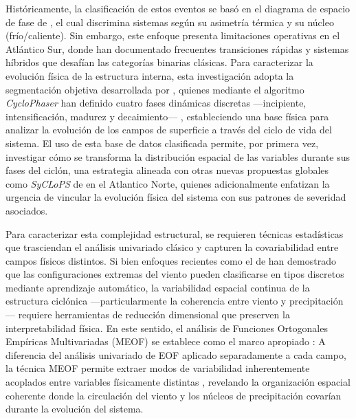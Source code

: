 Históricamente, la clasificación de estos eventos se basó en el diagrama de espacio de fase de \citet{hart2003cyclone}, el cual discrimina sistemas según su asimetría térmica y su núcleo (frío/caliente). Sin embargo, este enfoque presenta limitaciones operativas en el Atlántico Sur, donde \citet{reboita2022from} han documentado frecuentes transiciones rápidas y sistemas híbridos que desafían las categorías binarias clásicas. Para caracterizar la evolución física de la estructura interna, esta investigación adopta la segmentación objetiva desarrollada por \citet{coutodesouza2024new}, quienes mediante el algoritmo \textit{CycloPhaser} han definido cuatro fases dinámicas discretas —incipiente, intensificación, madurez y decaimiento— \citep{deSouza2025CycloPhaser}, estableciendo una base física para analizar la evolución de los campos de superficie a través del ciclo de vida del sistema. El uso de esta base de datos clasificada permite, por primera vez, investigar cómo se transforma la distribución espacial de las variables durante sus fases del ciclón, una estrategia alineada con otras nuevas propuestas globales como \textit{SyCLoPS} de \citet{han2025system} en el Atlantico Norte, quienes adicionalmente enfatizan la urgencia de vincular la evolución física del sistema con sus patrones de severidad asociados.

\label{subsec:intro_estrategia_estadistica}%
Para caracterizar esta complejidad estructural, se requieren técnicas estadísticas que trasciendan el análisis univariado clásico y capturen la covariabilidad entre campos físicos distintos. Si bien enfoques recientes como el de \citet{eisenstein2023identification} han demostrado que las configuraciones extremas del viento pueden clasificarse en tipos discretos mediante aprendizaje automático, la variabilidad espacial continua de la estructura ciclónica ---particularmente la coherencia entre viento y precipitación--- requiere herramientas de reducción dimensional que preserven la interpretabilidad física. En este sentido, el análisis de Funciones Ortogonales Empíricas Multivariadas (MEOF) se establece como el marco apropiado \citep{hannachi2007empirical}: A diferencia del análisis univariado de EOF aplicado separadamente a cada campo, la técnica MEOF permite extraer modos de variabilidad inherentemente acoplados entre variables físicamente distintas \citep{liang2018multivariate}, revelando la organización espacial coherente donde la circulación del viento y los núcleos de precipitación covarían durante la evolución del sistema.

